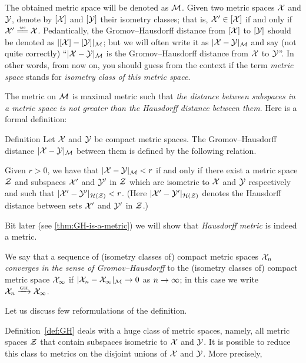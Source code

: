 The obtained metric space will be denoted as $\mathcal{M}$.
Given two metric spaces $\mathcal{X}$ and $\mathcal{Y}$,
denote by $[\mathcal{X}]$ and $[\mathcal{Y}]$ their isometry classes;
that is, $\mathcal{X}'\in [\mathcal{X}]$ if and only if $\spc{X}'\iso \spc{X}$.
Pedantically, the Gromov--Hausdorff distance from $[\mathcal{X}]$ 
to $[\mathcal{Y}]$ should be denoted as $|[\mathcal{X}]-[\mathcal{Y}]|_{\mathcal{M}}$;
but we will often write it as $|\mathcal{X}-\mathcal{Y}|_{\mathcal{M}}$ and say (not quite correctly) 
``$|\mathcal{X}-\mathcal{Y}|_{\mathcal{M}}$ is the Gromov--Hausdorff distance from  $\mathcal{X}$ 
to  $\mathcal{Y}$''.
In other words, from now on, 
you should guess from the context if the term \emph{metric space} stands for \emph{isometry class of this metric space}.

The metric on $\mathcal{M}$ is maximal metric such that \emph{the distance between subspaces in a metric space is not greater than the Hausdorff distance between them}.
Here is a formal definition:

\begin{thm}{Definition}\label{def:GH}
Let $\mathcal{X}$ and $\mathcal{Y}$ be compact metric spaces. 
The Gromov--Hausdorff distance $|\mathcal{X}-\mathcal{Y}|_{\mathcal{M}}$
between them is defined by the following
relation.
 
Given  $r > 0$, we have that $|\mathcal{X}-\mathcal{Y}|_{\mathcal{M}} < r$ if and only if there exist a metric
space $\mathcal{Z}$ and subspaces $\mathcal{X}'$ and $\mathcal{Y}'$ in $\mathcal{Z}$ which are isometric to $\mathcal{X}$ and $\mathcal{Y}$
respectively and such that $|\mathcal{X}'-\mathcal{Y}'|_{\mathcal{H}(\mathcal{Z})} < r$. 
(Here $|\mathcal{X}'-\mathcal{Y}'|_{\mathcal{H}(\mathcal{Z})}$ denotes the Hausdorff distance between sets $\mathcal{X}'$ and $\mathcal{Y}'$ in $\mathcal{Z}$.)
\end{thm}

Bit later (see \ref{thm:GH-is-a-metric}) we will show that \emph{Hausdorff metric} is indeed a metric.

We say that a sequence
of (isometry classes of) compact metric spaces $\mathcal{X}_n$ 
\emph{converges in the sense of Gromov--Hausdorff} to the (isometry classes of)
compact metric space $\mathcal{X}_\infty$ if $|\mathcal{X}_n - \mathcal{X}_\infty|_{\mathcal{M}} \to 0$ as $n\z\to\infty$;
in this case we write $\mathcal{X}_n\xrightarrow{\mbox{\tiny GH}} \mathcal{X}_\infty$.

Let us discuss few reformulations of the definition.

Definition~\ref{def:GH} deals with a huge class of metric spaces,
namely, all metric spaces $\mathcal{Z}$ that contain subspaces isometric to $\mathcal{X}$ and $\mathcal{Y}$.
It is possible to reduce this class to metrics on the disjoint unions of $\mathcal{X}$ and $\mathcal{Y}$. 
More precisely, 

